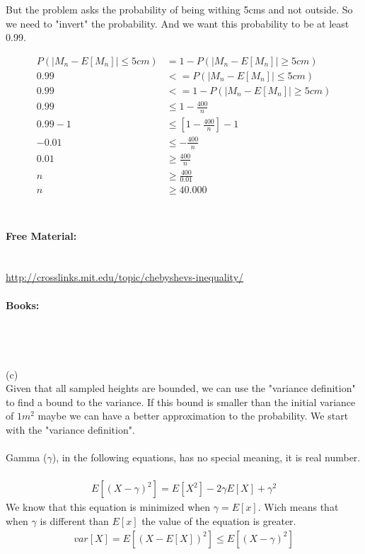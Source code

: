 \documentclass[10pt,a4paper]{article}
\begin{document}
	But the problem asks the probability of being withing 5cms and not outside. So we need to "invert" the probability. And we want this probability to be at least 0.99.
	
	\begin{align*}
	P(|M_n - E[M_n]| \le 5cm) &= 1 - P(|M_n - E[M_n]| \ge 5cm)
	\\
	0.99 &<= P(|M_n - E[M_n]| \le 5cm)\\
	0.99 &<= 1 - P(|M_n - E[M_n]| \ge 5cm)\\	
	0.99 &\le 1 - \frac{400}{n}\\
	0.99 - 1&\le [1 - \frac{400}{n}] - 1\\
	-0.01 &\le -\frac{400}{n}\\
	0.01 &\ge \frac{400}{n}\\	
	n &\ge \frac{400}{0.01}\\	
	n &\ge 40.000\\
	\end{align*}
	\\
	\\
	\textbf{Free Material:}\\
	\\
	\cite[section 19.2, page 792]{MIT6042}\\
	\url{http://crosslinks.mit.edu/topic/chebyshevs-inequality/}\\
	\\
	\textbf{Books:}\\
	\\
	\cite[section 5.1, page 267]{dimitriIntro}\\
	\cite[section 8.2, page 389]{sheldonrossIntroProb}\\
	\\
	(c)\\
	Given that all sampled heights are bounded, we can use the "variance definition" to find a bound to the variance. If this bound is smaller than the initial variance of $1m^2$ maybe we can have a better approximation to the probability. We start with the "variance definition".\\
	\\
	Gamma ($\gamma$), in the following equations, has no special meaning, it is real number.\\
	\\
	\begin{align*}
		E[(X-\gamma)^2] = E[X^2] - 2\gamma E[X] + \gamma^2
	\end{align*}
	We know that this equation is minimized when $\gamma=E[x]$. Wich means that when $\gamma$ is different than $E[x]$ the value of the equation is greater.
	\begin{align*}
		var[X] = E[(X-E[X])^2] \le E[(X-\gamma)^2]
	\end{align*}
	
\end{document}
